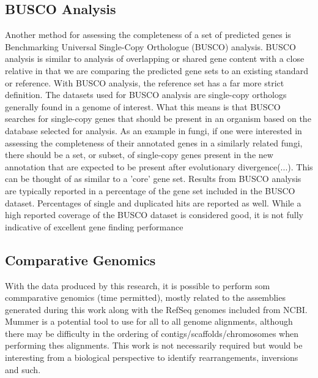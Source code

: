 \subsection{BUSCO Analysis}
Another method for assessing the completeness of a set of predicted
genes is Benchmarking Universal Single-Copy Orthologue (BUSCO)
analysis\cite{10.1093/molbev/msab199}. BUSCO analysis is similar to
analysis of overlapping or shared gene content with a close relative
in that we are comparing the predicted gene sets to an existing
standard or reference. With BUSCO analysis, the reference set has a
far more strict definition. The datasets used for BUSCO analysis are
single-copy orthologs generally found in a genome of
interest. What this means is that BUSCO searches for single-copy genes
that should be present in an organism based on the database selected
for analysis. As an example in fungi, if one were interested in
assessing the completeness of their annotated genes in a similarly
related fungi, there should be a set, or subset, of single-copy genes
present in the new annotation that are expected to be present after
evolutionary divergence(...). This can be thought of as similar to a
'core' gene set. Results from BUSCO analysis are typically reported in
a percentage of the gene set included in the BUSCO
dataset. Percentages of single and duplicated hits are reported as
well. While a high reported coverage of the BUSCO dataset is
considered good, it is not fully indicative of excellent gene finding
performance

\subsection{Comparative Genomics}

With the data produced by this research, it is possible to perform som
commparative genomics (time permitted), mostly related to the
assemblies generated during this work along with the RefSeq genomes
included from NCBI. Mummer is a potential tool to use for all to all
genome alignments, although there may be difficulty in the ordering of
contigs/scaffolds/chromosomes when performing thes alignments. This
work is not necessarily required but would be interesting from a
biological perspective to identify rearrangements, inversions and
such.
